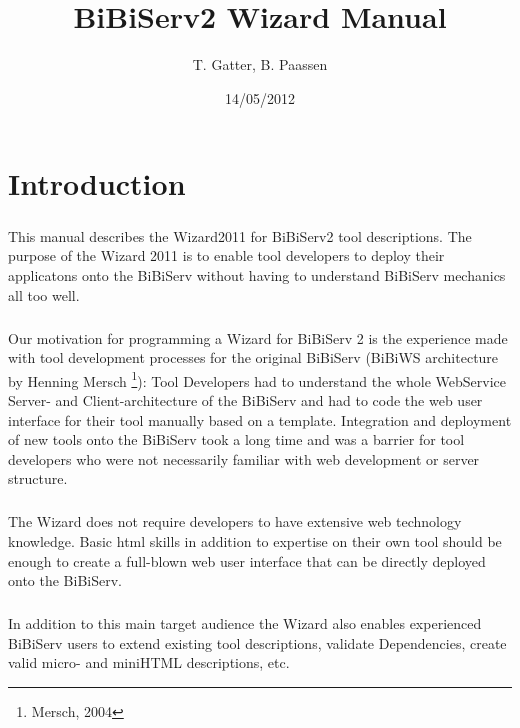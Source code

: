 \documentclass[a4paper,10pt]{book}
\title{BiBiServ2 Wizard Manual}
\author{T. Gatter, B. Paassen}
\date{14/05/2012}
\begin{document}
\maketitle

\tableofcontents
\chapter{Introduction}
\paragraph{} This manual describes the Wizard2011 for BiBiServ2 tool descriptions. The purpose of the Wizard 2011 is to enable tool developers to deploy their applicatons onto the BiBiServ without having to understand BiBiServ mechanics all too well.
\paragraph{} Our motivation for programming a Wizard for BiBiServ 2 is the experience made with tool development processes for the original BiBiServ (BiBiWS architecture by Henning Mersch \footnote{Mersch, 2004}): Tool Developers had to understand the whole WebService Server- and Client-architecture of the BiBiServ and had to code the web user interface for their tool manually based on a template. Integration and deployment of new tools onto the BiBiServ took a long time and was a barrier for tool developers who were not necessarily familiar with web development or server structure.
\paragraph{} The Wizard does not require developers to have extensive web technology knowledge. Basic html skills in addition to expertise on their own tool should be enough to create a full-blown web user interface that can be directly deployed onto the BiBiServ.
\paragraph{} In addition to this main target audience the Wizard also enables experienced BiBiServ users to extend existing tool descriptions, validate Dependencies, create valid micro- and miniHTML descriptions, etc.
\end{document}
